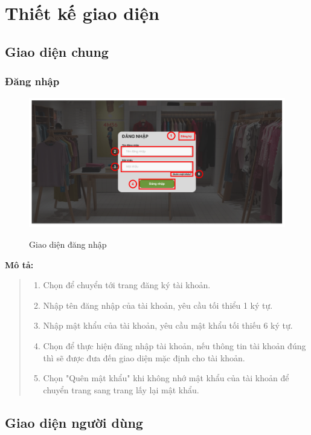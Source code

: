 \section{Thiết kế giao diện}

\subsection{Giao diện chung}
    \subsubsection{Đăng nhập}
    \begin{figure}[!htp]
        \centering
        \includegraphics[width=5in]{img/UI/customer/login.png}
        \label{1}
        \newline
        \caption{Giao diện đăng nhập}
    \end{figure}
    \textbf{Mô tả:} 
    \begin{quote}
        \begin{enumerate}
            \item Chọn để chuyển tới trang đăng ký tài khoản.
            \item Nhập tên đăng nhập của tài khoản, yêu cầu tối thiểu 1 ký tự.
            \item Nhập mật khẩu của tài khoản, yêu cầu mật khẩu tối thiếu 6 ký tự.
            \item Chọn để thực hiện đăng nhập tài khoản, nếu thông tin tài khoản đúng thì sẽ được đưa đến giao diện mặc định cho tài khoản.
            \item Chọn "Quên mật khẩu" khi không nhớ mật khẩu của tài khoản để chuyển trang sang trang lấy lại mật khẩu.
        \end{enumerate}        
    \end{quote}

\subsection{Giao diện người dùng}
